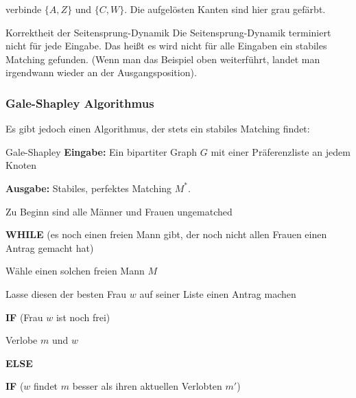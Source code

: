 \documentclass{panikzettel}
\newcommand\tab[1][1cm]{\hspace*{#1}}
\begin{document}
{\begin{halfboxr}
\begin{center}
	\end{center}
	verbinde $\{A,Z\}$ und $\{C,W\}$. Die aufgelösten Kanten sind hier grau gefärbt.
\end{halfboxr}

\begin{theo}{Korrektheit der Seitensprung-Dynamik}
	Die Seitensprung-Dynamik terminiert nicht für jede Eingabe. Das heißt es wird nicht für alle Eingaben ein stabiles Matching gefunden. (Wenn man das Beispiel oben weiterführt, landet man irgendwann wieder an der Ausgangsposition).
\end{theo}

\subsubsection{Gale-Shapley Algorithmus}

Es gibt jedoch einen Algorithmus, der stets ein stabiles Matching findet:

\begin{algo}{Gale-Shapley}
	\textbf{Eingabe:} Ein bipartiter Graph $G$ mit einer Präferenzliste an jedem Knoten
	
	\textbf{Ausgabe:} Stabiles, perfektes Matching $M^*$.
	\tcblower
	
	Zu Beginn sind alle Männer und Frauen ungematched
	
	\textbf{WHILE} (es noch einen freien Mann gibt, der noch nicht allen Frauen einen Antrag gemacht hat)
	
	\tab Wähle einen solchen freien Mann $M$
	
	\tab Lasse diesen der besten Frau $w$ auf seiner Liste einen Antrag machen
	
	\tab \textbf{IF} (Frau $w$ ist noch frei)
	
	\tab\tab Verlobe $m$ und $w$
	
	\tab \textbf{ELSE} 
	
	\tab\tab  \textbf{IF} ($w$ findet $m$ besser als ihren aktuellen Verlobten $m'$)
	

\end{algo}}
\end{document}
